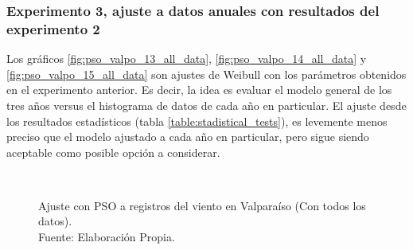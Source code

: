 \subsubsection{Experimento 3, ajuste a datos anuales con resultados del experimento 2}
Los gráficos \ref{fig:pso_valpo_13_all_data}, \ref{fig:pso_valpo_14_all_data} y \ref{fig:pso_valpo_15_all_data} son ajustes de Weibull con los parámetros obtenidos en el experimento anterior. Es decir, la idea es evaluar el modelo general de los tres años versus el histograma de datos de cada año en particular.
El ajuste desde los resultados estadísticos (tabla \ref{table:stadistical_tests}), es levemente menos preciso que el modelo ajustado a cada año en particular, pero sigue siendo aceptable como posible opción a considerar.
\begin{figure}[ht!]
    \centering
    \captionsetup{justification=centering,margin=2cm}
    \\   

    \caption{Ajuste con PSO a registros del viento en Valparaíso (Con todos los datos).\\ Fuente: Elaboración Propia.}
    \label{fig:subfigures}
\end{figure}

